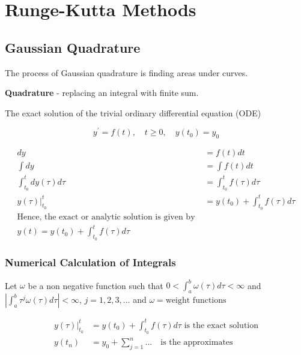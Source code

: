 \documentclass[12pt,a4paper]{article}
\begin{document}

\newpage

\section{Runge-Kutta Methods}

\subsection{Gaussian Quadrature}

The process of Gaussian quadrature is finding areas under curves.

\noindent
\textbf{Quadrature} - replacing an integral with finite sum.
\noindent

The exact solution of the trivial ordinary differential equation (ODE) 

\begin{equation}\tag{1.1}\label{eqn1.1}
y^\prime = f(t), \quad t\geq 0, \quad y(t_0) = y_0
\end{equation}

\begin{align*}
dy &= f(t)dt \\
\int dy &= \int f(t)dt \\
\int_{t_0}^t dy(\tau)d\tau &= \int_{t_0}^t f(\tau)d\tau \\
y(\tau)\vert_{t_0}^t &= y(t_0) + \int_{t_0}^t f(\tau)d\tau \\
\text{Hence, the exact or analytic solution is given by } \\
y(t) = y(t_0) + \int_{t_0}^t f(\tau)d\tau 
\end{align*}

\subsubsection{Numerical Calculation of Integrals}

Let $\omega$ be a non negative function such that $0 < \int_a^b \omega(\tau) d\tau < \infty$ and $\left| \int_a^b \tau^j\omega (\tau) d\tau \right| < \infty $,\quad
$j = 1,2,3, ... $  and $\omega = \text{weight functions}$ 

\begin{align*}
y(\tau)\vert_{t_0}^t &= y(t_0) + \int_{t_0}^t f(\tau)d\tau  \text{ is the exact solution} \\
y(t_n) &= y_0 + \sum_{j=1}^n \text{...} \quad \text{is the approximates}
\end{align*}
\end{document}
